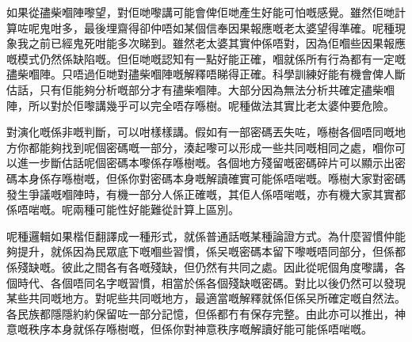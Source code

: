 如果從孻柴嗰陣嚟望，對佢哋嚟講可能會俾佢哋產生好能可怕嘅感覺。雖然佢哋計算咗呢鬼咁多，最後埋齋得卻仲唔如某個信奉因果報應嘅老太婆望得準確。呢種現象我之前已經鬼死咁能多次睇到。雖然老太婆其實仲係唔對，因為佢嗰些因果報應嘅模式仍然係缺陷嘅。但佢哋嘅認知有一點好能正確，嗰就係所有行為都有一定嘅孻柴嗰陣。只唔過佢哋對孻柴嗰陣嘅解釋唔睇得正確。科學訓練好能有機會俾人斷估話，只有佢能夠分析嘅部分才有孻柴嗰陣。大部分因為無法分析共確定孻柴嗰陣，所以對於佢嚟講幾乎可以完全唔存喺樹。呢種做法其實比老太婆仲要危險。

對演化嘅係非嘅判斷，可以咁樣樣講。假如有一部密碼丟失咗，喺樹各個唔同嘅地方你都能夠找到呢個密碼嘅一部分，湊起嚟可以形成一些共同嘅相同之處，嗰你可以進一步斷估話呢個密碼本嚟係存喺樹嘅。各個地方殘留嘅密碼碎片可以顯示出密碼本身係存喺樹嘅，但係你對密碼本身嘅解讀確實可能係唔啱嘅。喺樹大家對密碼發生爭議嘅嗰陣時，有機一部分人係正確嘅，其佢人係唔啱嘅，亦有機大家其實都係唔啱嘅。呢兩種可能性好能難從計算上區別。

呢種邏輯如果楷佢翻譯成一種形式，就係普通話嘅某種論證方式。為什麼習慣仲能夠提升，就係因為民眾底下嘅嗰些習慣，係㕦嘅密碼本留下嚟嘅唔同部分，但係都係殘缺嘅。彼此之間各有各嘅殘缺，但仍然有共同之處。因此從呢個角度嚟講，各個時代、各個唔同名字嘅習慣，相當於係各個殘缺嘅密碼。對比以後仍然可以發現某些共同嘅地方。對呢些共同嘅地方，最適當嘅解釋就係佢係㕦所確定嘅自然法。各民族都隱隱約約保留咗一部分記憶，但係都冇有保存完整。由此亦可以推出，神意嘅秩序本身就係存喺樹嘅，但係你對神意秩序嘅解讀好能可能係唔啱嘅。
